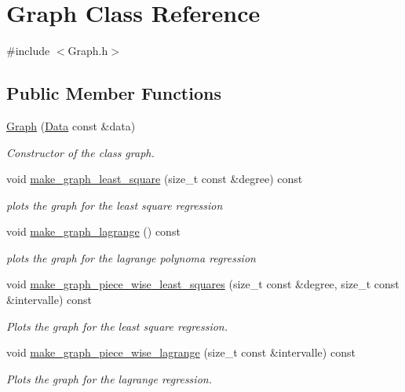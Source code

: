 \hypertarget{class_graph}{}\section{Graph Class Reference}
\label{class_graph}


{\ttfamily \#include $<$Graph.\+h$>$}

\subsection*{Public Member Functions}
\begin{DoxyCompactItemize}
\item 
\mbox{\hyperlink{class_graph_ac2cc4f7971589f9674f4fbf3b7dc200c}{Graph}} (\mbox{\hyperlink{struct_data}{Data}} const \&data)
\begin{DoxyCompactList}\small\item\em Constructor of the class graph. \end{DoxyCompactList}\item 
void \mbox{\hyperlink{class_graph_af3560cb4e5eaa08c33e3de253a4e60a3}{make\+\_\+graph\+\_\+least\+\_\+square}} (size\+\_\+t const \&degree) const
\begin{DoxyCompactList}\small\item\em plots the graph for the least square regression \end{DoxyCompactList}\item 
void \mbox{\hyperlink{class_graph_a5fd01460d3981748a22269f9953d3486}{make\+\_\+graph\+\_\+lagrange}} () const
\begin{DoxyCompactList}\small\item\em plots the graph for the lagrange polynoma regression \end{DoxyCompactList}\item 
void \mbox{\hyperlink{class_graph_ab4a370a88a1041561e0788817eccd142}{make\+\_\+graph\+\_\+piece\+\_\+wise\+\_\+least\+\_\+squares}} (size\+\_\+t const \&degree, size\+\_\+t const \&intervalle) const
\begin{DoxyCompactList}\small\item\em Plots the graph for the least square regression. \end{DoxyCompactList}\item 
void \mbox{\hyperlink{class_graph_a3206cf8103554c4c84f20abc96a1413c}{make\+\_\+graph\+\_\+piece\+\_\+wise\+\_\+lagrange}} (size\+\_\+t const \&intervalle) const
\begin{DoxyCompactList}\small\item\em Plots the graph for the lagrange regression. \end{DoxyCompactList}\item 

\end{DoxyCompactItemize}
